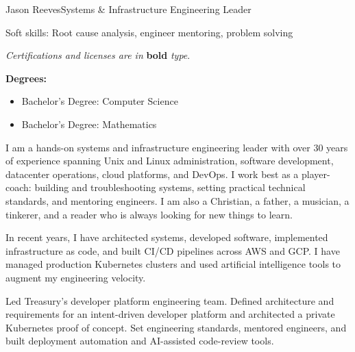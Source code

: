 \documentclass{article}
\begin{document}
\begin{cv}{Jason Reeves}{Systems \& Infrastructure Engineering Leader}
\cvseparator
\begin{cvitem}
  \footnotesize Soft skills: Root cause analysis, engineer mentoring, problem solving
\end{cvitem}

\begin{center}
  \footnotesize * \textit{Certifications and licenses are in} \textbf{bold} \textit{type}.
\end{center}
\vspace{-3mm}


\textbf{Degrees:}
\begin{itemize}
  \item Bachelor's Degree: Computer Science
  \item Bachelor's Degree: Mathematics
\end{itemize}

\switchcolumn
\renewcommand{\iscvsidebar}{0}

I am a hands-on systems and infrastructure engineering leader with over 30 years of experience spanning Unix and Linux administration, software development, datacenter operations, cloud platforms, and DevOps. I work best as a player-coach: building and troubleshooting systems, setting practical technical standards, and mentoring engineers. I am also a Christian, a father, a musician, a tinkerer, and a reader who is always looking for new things to learn.
\vspace*{3mm}

In recent years, I have architected systems, developed software, implemented infrastructure as code, and built CI/CD pipelines across AWS and GCP. I have managed production Kubernetes clusters and used artificial intelligence tools to augment my engineering velocity.

\begin{cvevent}[June 2026][present]
    Led Treasury's developer platform engineering team. Defined architecture and requirements for an intent-driven developer platform and architected a private Kubernetes proof of concept. Set engineering standards, mentored engineers, and built deployment automation and AI-assisted code-review tools.
    \vspace*{3mm}


\end{cvevent}
\end{cv}
\end{document}
